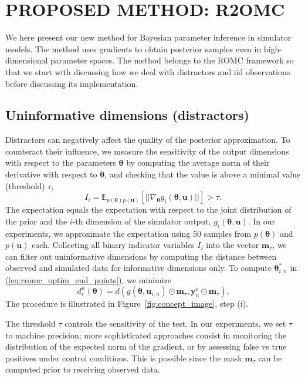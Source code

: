 \documentclass[twoside]{article}
\newlength{\secvspace}
\newlength{\subsecvspace}
\newcommand{\thb}{\boldsymbol{\theta}}
\newcommand{\ub}{\mathbf{u}}
\newcommand{\data}{\mathbf{y}^o}
\newcommand{\E}{\mathbb{E}}
\newcommand{\rromc}{R2OMC}
\newcommand{\mask}{\mathbf{m}_\tau}
\begin{document}
\vspace{\secvspace}
\section{PROPOSED METHOD: \rromc}
\vspace{\secvspace}
\label{sec:rromc}

We here present our new method for Bayesian parameter inference in simulator models. The method uses gradients to obtain posterior samples even in high-dimensional parameter spaces. The method belongs to the ROMC framework so that we start with discussing how we deal with distractors and iid observations before discussing its implementation.

\vspace{\subsecvspace}
\subsection{Uninformative dimensions (distractors)}
\vspace{\subsecvspace}
\label{subsec:distractors}
Distractors can negatively affect the quality of the posterior approximation. To counteract their influence, we measure the sensitivity of the output dimensions with respect to the parameters $\thb$ by computing the average norm of their derivative with respect to $\thb$, and checking that the value is above a minimal value (threshold) $\tau$, 
\begin{equation}
  \label{eq:informative_dimensions}
  I_i = \E_{p(\thb)p(\ub)}\left[ || \nabla_{\thb} g_i(\thb, \ub) || \right] > \tau.
\end{equation}
The expectation equals the expectation with respect to the joint distribution of the prior and the $i$-th dimension of the simulator output, $g_i(\thb, \ub)$. In our experiments, we approximate the expectation using $50$ samples from $p(\thb)$ and $p(\ub)$ each. Collecting all binary indicator variables $I_i$ into the vector $\mask$, we can filter out uninformative dimensions by computing the distance between observed and simulated data for informative dimensions only. To compute $\thb_{i,n}^*$ in (\ref{eq:rromc_optim_end_points}), we minimize
\begin{equation}
d_i^n(\thb) = d(g(\thb, \ub_{i,n})\odot \mask, \data_n \odot \mask).
\label{eq:rromc-masked-distance}
\end{equation}
The procedure is illustrated in Figure~\ref{fig:concept_image}, step (i). 

The threshold $\tau$ controls the sensitivity of the test. In our experiments, we set $\tau$ to machine precision; more sophisticated approaches consist in monitoring the distribution of the expected norm of the gradient, or by assessing false vs true positives under control conditions. This is possible since the mask $\mask$ can be computed prior to receiving observed data.
\end{document}
